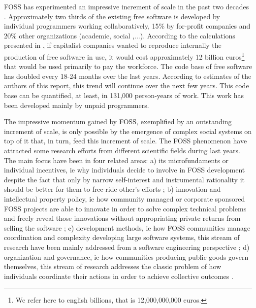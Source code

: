 FOSS has experimented an impressive increment of scale in the past two decades \citep{ghosh:2006}. Approximately two thirds of the existing free software is developed by individual programmers working collaboratively, 15\% by for-profit companies and 20\% other organizations (academic, social ,...). According to the calculations presented in \citet{ghosh:2006}, if capitalist companies wanted to reproduce internally the production of free software in use, it would cost approximately 12 billion euros\footnote{We refer here to english billions, that is 12,000,000,000 euros.} that would be used primarily to pay the workforce. The code base of free software has doubled every 18-24 months over the last years. According to estimates of the authors of this report, this trend will continue over the next few years. This code base can be quantified, at least, in 131,000 person-years of work. This work has been developed mainly by unpaid programmers.

The impressive momentum gained by FOSS, exemplified by an outstanding increment of scale, is only possible by the emergence of complex social systems on top of it that, in turn, feed this increment of scale. The FOSS phenomenon have attracted some research efforts from different scientific fields during last years. The main focus have been in four related areas: a) its microfundaments or individual incentives, ie why individuals decide to involve in FOSS development despite the fact that only by narrow self-interest and instrumental rationality it should be better for them to free-ride other's efforts \citep{hars:2002,lakhani:2003,hertel:2003,weber:2004,roberts:2006}; b) innovation and intellectual property policy, ie how community managed or corporate sponsored FOSS projects are able to innovate in order to solve complex technical problems and freely reveal those innovations without appropriating private returns from selling the software \citep{kogut:2001,hippel:2001,hippel:2003,vonKrogh2003,omahony:2003,west:2003,lerner:2005,hargrave:2006,west:2008}; c) development methods, ie how FOSS communities manage coordination and complexity developing large software systems, this stream of research have been mainly addressed from a software engineering perspective \citep{godfrey:2000,feller:2000,mockus:2002,koch:2002,weber:2004,maccormack:2006}; d) organization and governance, ie how communities producing public goods govern themselves, this stream of research addresses the classic problem of how individuals coordinate their actions in order to achieve collective outcomes \citep{ljungberg:2000,omahony:2007,west:2008}.


